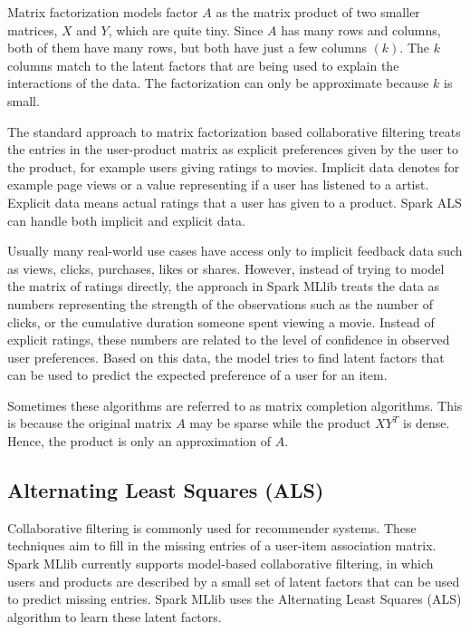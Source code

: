 \documentclass[main.tex]{thesis.tex}
\begin{document}
Matrix factorization models factor $A$ as the matrix product of two smaller matrices, $X$ and $Y$, which are quite tiny.
Since $A$ has many rows and columns, both of them have many rows, but both have just a few columns $(k)$. The $k$ columns match to the latent factors that are being used to explain the interactions of the data.
The factorization can only be approximate because $k$ is small. \cite{ryza15}

The standard approach to matrix factorization based collaborative filtering treats the entries in the user-product matrix as explicit preferences given by the user to the product, for example users giving ratings to movies.
Implicit data denotes for example page views or a value representing if a user has listened to a artist. Explicit data means actual ratings that a user has given to a product.
Spark ALS can handle both implicit and explicit data. \cite{spark14} \cite{ryza15}

Usually many real-world use cases have access only to implicit feedback data such as views, clicks, purchases, likes or shares.
However, instead of trying to model the matrix of ratings directly, the approach in Spark MLlib treats the data as numbers representing the strength of the observations such as the number of clicks, or the cumulative duration someone spent viewing a movie.
Instead of explicit ratings, these numbers are related to the level of confidence in observed user preferences.
Based on this data, the model tries to find latent factors that can be used to predict the expected preference of a user for an item. \cite{spark14}

Sometimes these algorithms are referred to as matrix completion algorithms.
This is because the original matrix $A$ may be sparse while the product $XY^T$ is dense.
Hence, the product is only an approximation of $A$. \cite{ryza15}

\subsection{Alternating Least Squares (ALS)}

Collaborative filtering is commonly used for recommender systems.
These techniques aim to fill in the missing entries of a user-item association matrix.
Spark MLlib currently supports model-based collaborative filtering, in which users and products are described by a small set of latent factors that can be used to predict missing entries.
Spark MLlib uses the Alternating Least Squares (ALS) algorithm to learn these latent factors. \cite{spark14}
\end{document}
